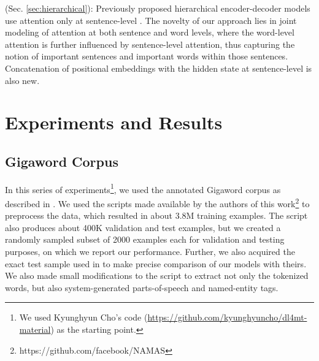 \documentclass[11pt]{article}
\begin{document}
 (Sec. \ref{sec:hierarchical}): Previously proposed hierarchical encoder-decoder models use attention only at sentence-level \cite{hiero_encdec}. The novelty of our approach lies in joint modeling of attention at both sentence and word levels, where the word-level attention is further influenced by sentence-level attention, thus capturing the notion of important sentences and important words within those sentences. Concatenation of positional embeddings with the hidden state at sentence-level is also new.

 \section{Experiments and Results}\label{sec:exp}

\subsection{Gigaword Corpus}

In this series of experiments\footnote{We used Kyunghyun Cho's code (\url{https://github.com/kyunghyuncho/dl4mt-material}) as the starting point.}, we used the annotated Gigaword corpus as described in . We used the scripts made available by the authors of this work\footnote{https://github.com/facebook/NAMAS} to preprocess the data, which resulted in about 3.8M training examples. The script also produces about 400K validation and test examples, but we created a randomly sampled subset of 2000 examples each for validation and testing purposes, on which we report our performance. Further, we also acquired the exact test sample used in  to make precise comparison of our models with theirs.
We also made small modifications to the script to extract not only the tokenized words, but also system-generated parts-of-speech and named-entity tags. 
\end{document}
